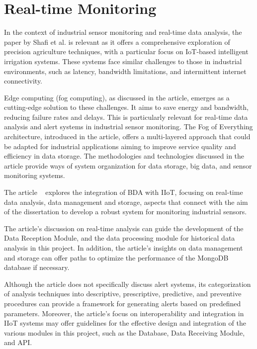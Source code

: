 \section{Real-time Monitoring}

In the context of industrial sensor monitoring and real-time data analysis, the paper by Shafi et al. \cite{shafi2019precision} is relevant as it offers a comprehensive exploration of precision agriculture techniques, with a particular focus on IoT-based intelligent irrigation systems. These systems face similar challenges to those in industrial environments, such as latency, bandwidth limitations, and intermittent internet connectivity.

Edge computing (fog computing), as discussed in the article, emerges as a cutting-edge solution to these challenges. It aims to save energy and bandwidth, reducing failure rates and delays. This is particularly relevant for real-time data analysis and alert systems in industrial sensor monitoring. The Fog of Everything architecture, introduced in the article, offers a multi-layered approach that could be adapted for industrial applications aiming to improve service quality and efficiency in data storage. The methodologies and technologies discussed in the article provide ways of system organization for data storage, big data, and sensor monitoring systems.

The article ~\cite{REHMAN} explores the integration of \gls{BDA} with \gls{IIoT}, focusing on real-time data analysis, data management and storage, aspects that connect with the aim of the dissertation to develop a robust system for monitoring industrial sensors.

The article's discussion on real-time analysis can guide the development of the Data Reception Module, and the data processing module for historical data analysis in this project. In addition, the article's insights on data management and storage can offer paths to optimize the performance of the MongoDB database if necessary.

Although the article does not specifically discuss alert systems, its categorization of analysis techniques into descriptive, prescriptive, predictive, and preventive procedures can provide a framework for generating alerts based on predefined parameters. Moreover, the article's focus on interoperability and integration in IIoT systems may offer guidelines for the effective design and integration of the various modules in this project, such as the Database, Data Receiving Module, and \gls{API}.

